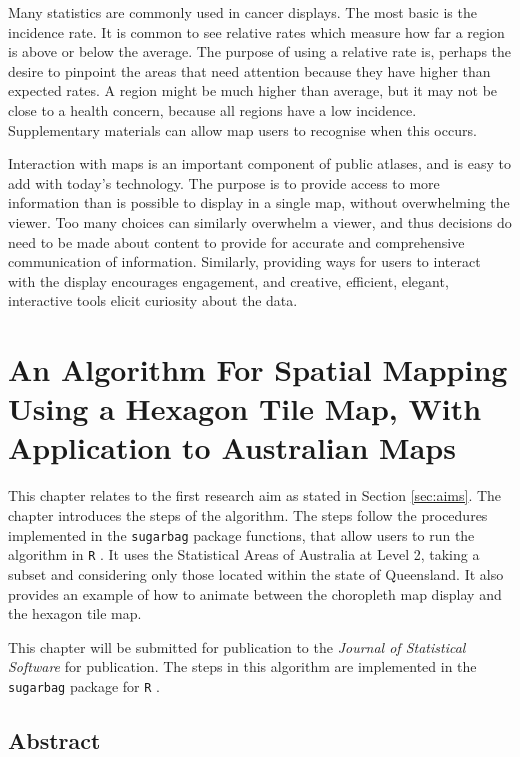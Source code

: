 \documentclass{monashthesis}
\begin{document}
Many statistics are commonly used in cancer displays. The most basic is the incidence rate. It is common to see relative rates which measure how far a region is above or below the average. The purpose of using a relative rate is, perhaps the desire to pinpoint the areas that need attention because they have higher than expected rates.
A region might be much higher than average, but it may not be close to a health concern, because all regions have a low incidence. Supplementary materials can allow map users to recognise when this occurs.

Interaction with maps is an important component of public atlases, and is easy to add with today's technology. The purpose is to provide access to more information than is possible to display in a single map, without overwhelming the viewer. Too many choices can similarly overwhelm a viewer, and thus decisions do need to be made about content to provide for accurate and comprehensive communication of information. Similarly, providing ways for users to interact with the display encourages engagement, and creative, efficient, elegant, interactive tools elicit curiosity about the data.

\hypertarget{algorithm}{%
\chapter{An Algorithm For Spatial Mapping Using a Hexagon Tile Map, With Application to Australian Maps}\label{algorithm}}

This chapter relates to the first research aim as stated in Section \ref{sec:aims}.
The chapter introduces the steps of the algorithm.
The steps follow the procedures implemented in the \texttt{sugarbag} \autocite{sugarbag} package functions, that allow users to run the algorithm in \texttt{R} \autocite{R}. It uses the Statistical Areas of Australia at Level 2, taking a subset and considering only those located within the state of Queensland.
It also provides an example of how to animate between the choropleth map display and the hexagon tile map.

This chapter will be submitted for publication to the \emph{Journal of Statistical Software} for publication.
The steps in this algorithm are implemented in the \texttt{sugarbag} \autocite{sugarbag} package for \texttt{R} \autocite{R}.

\hypertarget{abstract3}{%
\section*{Abstract}\label{abstract3}}
\end{document}
